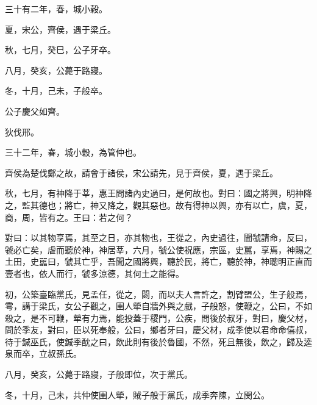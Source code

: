 \begin{pinyinscope}
三十有二年，春，城小穀。

夏，宋公，齊侯，遇于梁丘。

秋，七月，癸巳，公子牙卒。

八月，癸亥，公薨于路寢。

冬，十月，己未，子般卒。

公子慶父如齊。

狄伐邢。

三十二年，春，城小穀，為管仲也。

齊侯為楚伐鄭之故，請會于諸侯，宋公請先，見于齊侯，夏，遇于梁丘。

秋，七月，有神降于莘，惠王問諸內史過曰，是何故也。對曰：國之將興，明神降之，監其德也；將亡，神又降之，觀其惡也。故有得神以興，亦有以亡，虞，夏，商，周，皆有之。王曰：若之何？

對曰：以其物享焉，其至之日，亦其物也，王從之，內史過往，聞虢請命，反曰，虢必亡矣，虐而聽於神，神居莘，六月，虢公使祝應，宗區，史嚚，享焉，神賜之土田，史嚚曰，虢其亡乎，吾聞之國將興，聽於民，將亡，聽於神，神聰明正直而壹者也，依人而行，虢多涼德，其何土之能得。

初，公築臺臨黨氏，見孟任，從之，閟，而以夫人言許之，割臂盟公，生子般焉，雩，講于梁氏，女公子觀之，圉人犖自牆外與之戲，子般怒，使鞭之，公曰，不如殺之，是不可鞭，犖有力焉，能投蓋于稷門，公疾，問後於叔牙，對曰，慶父材，問於季友，對曰，臣以死奉般，公曰，鄉者牙曰，慶父材，成季使以君命命僖叔，待于鍼巫氏，使鍼季酖之曰，飲此則有後於魯國，不然，死且無後，飲之，歸及逵泉而卒，立叔孫氏。

八月，癸亥，公薨于路寢，子般即位，次于黨氏。

冬，十月，己未，共仲使圉人犖，賊子般于黨氏，成季奔陳，立閔公。


\end{pinyinscope}